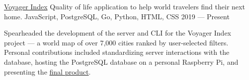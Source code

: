 \showoff
{\textcolor{my-blue}{\href{https://voyager-index.herokuapp.com}{Voyager Index}}}
{Quality of life application to help world travelers find their next home.}
{JavaScript, PostgreSQL, Go, Python, HTML, CSS}
{2019 --- Present}

Spearheaded the development of the server and CLI for the Voyager Index project — a world map of over 7,000 cities ranked by user-selected filters. Personal contributions included standardizing server interactions with the database, hosting the PostgreSQL database on a personal Raspberry Pi, and presenting the \textcolor{my-blue}{\href{https://liambeckman.com/pkgs/posters/voyager-index.pdf}{final product}}.


